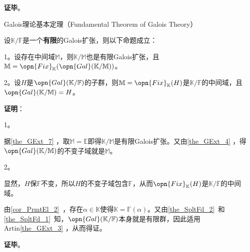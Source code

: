 \textbf{证毕}。











\begin{theorem}{Galois理论基本定理（Fundamental Theorem of Galois Theory）}\label{the_GExt_10}

设$\mathbb{K}/\mathbb{F}$是一个\textbf{有限}的Galois扩张，则以下命题成立：

1。设存在中间域$\mathbb{M}$，则$\mathbb{K}/\mathbb{M}$也是有限Galois扩张，且$\mathbb{M}=\opn{Fix}_\mathbb{K}(\opn{Gal}(\mathbb{K}/\mathbb{M}))$。

2。设$H$是$\opn{Gal}(\mathbb{K}/\mathbb{F})$的子群，则$\mathbb{M}=\opn{Fix}_\mathbb{K}(H)$是$\mathbb{K}/\mathbb{F}$的中间域，且$\opn{Gal}(\mathbb{K}/\mathbb{M})=H$。


\end{theorem}

\textbf{证明}：

1。

据\autoref{the_GExt_7} ，取$\mathbb{M}=\mathbb{E}$即得$\mathbb{K}/\mathbb{M}$是有限Galois扩张。又由\autoref{the_GExt_4} ，得$\opn{Gal}(\mathbb{K}/\mathbb{M})$的不变子域就是$\mathbb{M}$。

2。

显然，$H$保$\mathbb{F}$不变，所以$H$的不变子域包含$\mathbb{F}$，从而$\opn{Fix}_\mathbb{K}(H)$是$\mathbb{K}/\mathbb{F}$的中间域。

由\autoref{cor_PrmtEl_2}~，存在$\alpha\in\mathbb{K}$使得$\mathbb{K}=\mathbb{F}(\alpha)$。又由\autoref{the_SpltFd_2}~和\autoref{the_SpltFd_1}~知，$\opn{Gal}(\mathbb{K}/\mathbb{F})$本身就是有限群，因此适用Artin\autoref{the_GExt_3} ，从而得证。

\textbf{证毕}。


















